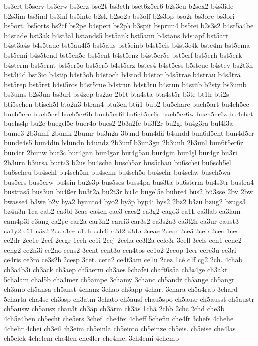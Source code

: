 {bs3ert
b5serv
bs3erw
bs3erz
bse2t
bs3eth
bset6z5er6
b2s3eu
b2sex2
b4s3ide
b2s3im
bs3ind
bs3inf
bs5inte
b2sk
b2so2b
bs3off
b2s3op
bso2r
bs3orc
bs3ori
bs5ort.
bs5orts
bs2öf
bs2pe
b4speri
bs2ph
b3spit
bsprun4
bs5rei
b2s3s2
b4st5a4be
b4stade
bst3ak
b4st3al
bstands5
bst5ank
bst5ann
b4stans
b4stapf
bst5art
b4st3a4s
b4s5tauc
bst5au4f5
bst5aus
bst5einb
b4st5eis
b4st3e4k
bste4m
bst5ema
bst5emi
b4s5tend
bst5en5e
bst5ent
b4st5enz
b4st5er5e
bst5erf
bst5erh
bst5erk
b4sterm
bst5ernt
bst5er5o
bst5erö
b4st5erz
bstes4
b4st5ess
b5steue
b4stev
bs2t3h
bst3i4d
bst3io
b4stip
b4st3ob
b4stoch
b4stod
b4stor
b4s5trae
b4strau
b4s3trä
bst5rep
bst5ret
b4st5ros
b4st5rue
b4strun
b4st3rü
b4stun
b4stüb
b2sty
bs3umb
bs3ums
b2s3un
bs3url
bs4zep
bs2zo
2b1t
bta4sta
bta4st5r
b3te
bt1h
bti2s
bti5schen
btisch5l
bto2n3
btran4
btu3en
btü1
bub2
bu5chare
buch5art
bu4ch5ec
buch5ere
buch5erf
buch5er6h
buch5er6l
bu6ch5er6s
buch5er6w
buch5er6z
bu4chet
buchs4p
bu2e
buegel5e
buer4o
bues2
2b3u2fe
bu3f2r
bu2gl
bu4g3ra
bul4l3a
bume3
2b3umf
2bumk
2bumr
bu3n2a
3bund
bun4dä
b4undd
bun6d5ent
bun4d5er
bunde4s5
bun4din
b4undn
b4undz
2b3unf
b3un3gn
2b3unh
2b3unl
bun6t5er6z
bun4tr
2bunw
bur3c
bur4gan
bur4gar
bur4g5au
bur4gin
bur4gl
bur4gr
bu3ri
2b3urn
b3ursa
burts3
b2us
bu4scha
busch5ar
bus5chau
bu6schei
bu6sch5el
bu6scheu
bu4schl
bu4sch5m
bu4schn
bu4sch5o
bu4schr
bu4schw
busch5wa
bus5ers
bus5erw
bu4sin
bu2s3p
bus5ses
buss4pa
bus3ta
bu6sterm
bu4s3tr
bustra4
bustras5
bus3un
bu4ßer
bu3t2a
bu2t3r
bü1c
bügel5e
bühre4
büs2
bü3sse
2bv
2bw
bwasse4
b3we
b2y
bya2
byauto4
byo2
by3p
byp4i
bys2
2bz2
b3zu
bzug2
bzugs3
bz4u3n
1ca
cab2
ca3bl
3cac
ca4ch
cae3
caes2
ca3g2
cago3
ca1h
ca3lab
ca3lam
cam4p3l
c3ang
ca2pe
car2a
car3n2
carri3
car3s2
ca3s2a3
ca3t2h
ca3ur
caust3
ca1y2
cä1
cäs2
2cc
c1ce
c1ch
cch4i
c2d2
c3do
2ceae
2cear
2ceä
2ceb
2cec
1ced
ce2dr
2ce1e
2cef
2cegr
1ceh
ce1i
2cej
2ceka
ce3l2a
cele3r
3cell
3cels
cen1
cene2
ceng2
ce2n3i
ce2no
cens2
3cent
cent3o
cen4tos
ce1o2
2ceop
1cer
cere3u
ce3ri
ce4ris
ce3ro
ce3s2h
2cesp
3cet.
ceta2
ce4t3am
ce1u
2cez
1cé
c1f
cg2
2ch.
4chab
ch3a4b3i
ch3ack
ch3aep
ch5aerm
ch3aes
5chafei
chaft6s5a
ch3a4ge
ch3akt
5chalam
chal5b
cha4mer
ch5ampe
3chamy
3chanc
ch5andr
ch5ange
ch5angr
ch3ano
ch5ansa
ch5anst
4chanz
3chao
ch3app
4char.
3chara
ch5a4rab
3chard
5charta
cha4sc
ch3asp
ch3atm
3chato
ch5ausf
chau5spo
ch5ausr
ch5ausst
ch5austr
ch5ausw
ch5ausz
chau3t
ch3äp
ch3ärm
ch3äs
1châ
2chb
2chc
2chd
che3b
4ch5e4ben
ch5echt
che5ers
3chef.
che4fei
4cheff
5chefin
che4fr
3chefs
4chehe
4chehr
4chei
ch3eil
ch3eim
ch5einla
ch5eintö
ch5einze
ch5eis.
ch5eise
che4las
ch5elek
4chelem
che4len
che4ler
che4me.
3ch4emi
4chemp
}

